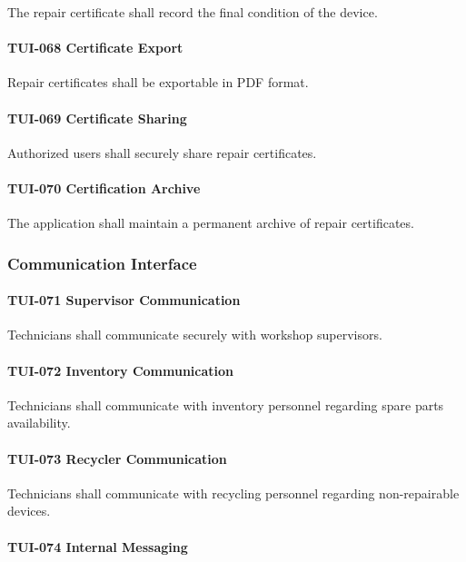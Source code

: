 The repair certificate shall record the final condition of the device.

\paragraph{TUI-068 Certificate Export}

Repair certificates shall be exportable in PDF format.

\paragraph{TUI-069 Certificate Sharing}

Authorized users shall securely share repair certificates.

\paragraph{TUI-070 Certification Archive}

The application shall maintain a permanent archive of repair
certificates.


\subsubsection*{Communication Interface}

\paragraph{TUI-071 Supervisor Communication}

Technicians shall communicate securely with workshop supervisors.

\paragraph{TUI-072 Inventory Communication}

Technicians shall communicate with inventory personnel regarding spare
parts availability.

\paragraph{TUI-073 Recycler Communication}

Technicians shall communicate with recycling personnel regarding
non-repairable devices.

\paragraph{TUI-074 Internal Messaging}


